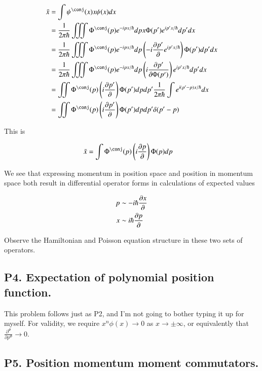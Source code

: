 \documentclass{article}
\newcommand{\PDN}[3]{\frac{\partial^{#3} {#2}}{\partial {#1}^{#3}}}
\begin{document}
\begin{align*}
\bar{x} 
&= \int \psi^\conj(x) x \psi(x) dx \\
&= 
\inv{2\pi\hbar} \iiint \Phi^\conj(p) e^{-ipx/\hbar} dp x \Phi(p') e^{ip'x/\hbar} dp' dx \\
&= 
\inv{2\pi\hbar} \iiint \Phi^\conj(p) e^{-ipx/\hbar} dp \left( -i \PD{p'}{} e^{ip'x/\hbar} \right) \Phi(p') dp' dx \\
&= 
\inv{2\pi\hbar} \iiint \Phi^\conj(p) e^{-ipx/\hbar} dp \left( i \PD{p'}{\Phi(p')} \right) e^{ip'x/\hbar} dp' dx \\
&= 
\iint \Phi^\conj(p) \left( i \PD{p'}{} \right) {\Phi(p')} dp dp' \inv{2\pi\hbar} \int e^{i(p'-p)x/\hbar} dx  \\
&= 
\iint \Phi^\conj(p) \left( i \PD{p'}{} \right) {\Phi(p')} dp dp' \delta(p'-p)  \\
\end{align*}

This is

\begin{align*}
\bar{x} &= \int \Phi^\conj(p) \left( i \PD{p}{} \right) {\Phi(p)} dp 
\end{align*}

We see that expressing momentum in position space and position in momentum space both result in differential
operator forms in calculations of expected values

\begin{align*}
p &\sim -i \hbar \frac{\partial{x}}{\partial {}} \\
x &\sim i \hbar \frac{\partial{p}}{\partial {}}
\end{align*}

Observe the Hamiltonian and Poisson equation structure in these two sets of operators.

\subsection{ P4. Expectation of polynomial position function. }

This problem follows just as P2, and I'm not going to bother typing it up for myself.  For validity, we require
$x^n \phi(x) \rightarrow 0$ as $x \rightarrow \pm \infty$, or equivalently that $\PDN{p}{}{\Phi} \rightarrow 0$.

\subsection{ P5. Position momentum moment commutators. }



\end{document}
